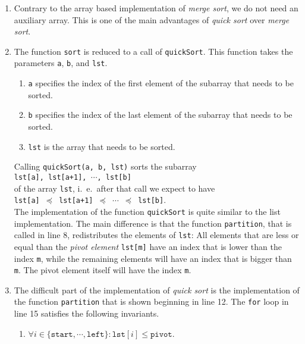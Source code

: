 \begin{enumerate}
\item Contrary to the array based implementation of \emph{merge sort}, we do not need an auxiliary
      array.  This is one of the main advantages of \emph{quick sort} over \emph{merge sort}.
\item The function \texttt{sort} is reduced to a call of \texttt{quickSort}.  This function
      takes the parameters \texttt{a}, \texttt{b}, and \texttt{lst}.  
      \begin{enumerate}
      \item \texttt{a} specifies the index of the first element of the subarray that needs to be
            sorted.
      \item \texttt{b} specifies the index of the last element of the subarray that needs to be
            sorted. 
      \item \texttt{lst} is the array that needs to be sorted.
      \end{enumerate}
      Calling \texttt{quickSort(a, b, lst)} sorts the subarray \\[0.2cm]
      \hspace*{1.3cm} 
      \texttt{lst[a], lst[a+1], $\cdots$, lst[b]}
      \\[0.2cm]
      of the array \texttt{lst}, i.~e.~after that call we expect to have\\[0.2cm]
      \hspace*{1.3cm}
      \texttt{lst[a] $\preceq$ lst[a+1] $\preceq$ $\cdots$ $\preceq$ lst[b]}.
      \\[0.2cm]
      The implementation of the function \texttt{quickSort}
      is quite similar to the list implementation.  The main difference is that the function
      \texttt{partition}, that is called in line 8, redistributes the elements of \texttt{lst}:
      All elements that are less or equal than the \emph{pivot element} \texttt{lst[m]}
      have an index that is lower than the index \texttt{m}, while the remaining elements will have
      an index that is bigger than \texttt{m}.  The pivot element itself will have the index \texttt{m}.
\item The difficult part of the implementation of \emph{quick sort} is the implementation of the
      function \texttt{partition} that is shown beginning in line 12.
      The \texttt{for} loop in line 15 satisfies the following invariants.
      \begin{enumerate}
      \item $\forall i \in \{ \mathtt{start}, \cdots, \mathtt{left} \} : \mathtt{lst}[i] \leq \mathtt{pivot}$.


\end{enumerate}
\end{enumerate}

